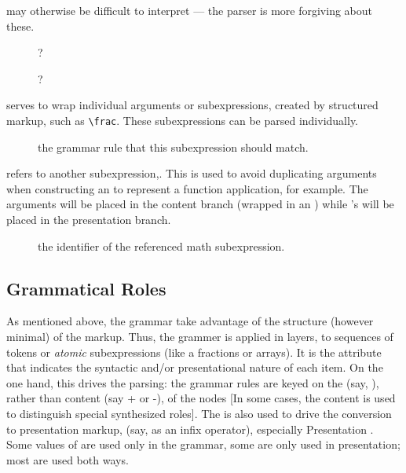 \documentclass{book}
\begin{document}
\begin{description}
  may otherwise be difficult to interpret --- the parser is more forgiving about these.
  \begin{description}
    \item[] ?
    \item[] ?
  \end{description}
\item[\elementref{XMArg}] serves to wrap individual arguments or subexpressions, created by
  structured markup, such as \verb|\frac|.  These subexpressions can be parsed individually.
  \begin{description}
    \item[] the grammar rule that this subexpression should match.
  \end{description}
\item[\elementref{XMRef}] refers to another subexpression,.  This is used to avoid duplicating
  arguments when constructing an  to represent a function application, for example.  
  The arguments will be placed in the content branch (wrapped in an ) while
  's will be placed in the presentation branch.
  \begin{description}
    \item[] the identifier of the referenced math subexpression.
  \end{description}
\end{description}

\subsection{Grammatical Roles}\label{math.details.roles}
As mentioned above, the grammar take advantage of the structure (however minimal) of the markup.
Thus, the grammer is applied in layers, to sequences of tokens or \emph{atomic} 
subexpressions (like a fractions or arrays). It is the  attribute
that indicates the syntactic and/or presentational nature of each item.
On the one hand, this drives the parsing: the grammar rules are keyed
on the  (say, ), rather than content (say + or -), of the nodes
[In some cases, the content is used to distinguish special synthesized roles].
The  is also used to drive the conversion to presentation markup, 
(say, as an infix operator), especially Presentation \MathML.
Some values of  are used only in the grammar,
some are only used in presentation; most are used both ways.
\end{document}
